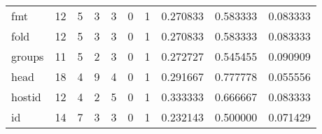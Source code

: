 \begin{longtable}{lrrrrrrrrr}
fmt       &                                      12 &                                                  5 &                                                  3 &                                                  3 &                                                  0 &                                                  1 &                                           0.270833 &                               0.583333 &                             0.083333 \\
fold      &                                      12 &                                                  5 &                                                  3 &                                                  3 &                                                  0 &                                                  1 &                                           0.270833 &                               0.583333 &                             0.083333 \\
groups    &                                      11 &                                                  5 &                                                  2 &                                                  3 &                                                  0 &                                                  1 &                                           0.272727 &                               0.545455 &                             0.090909 \\
head      &                                      18 &                                                  4 &                                                  9 &                                                  4 &                                                  0 &                                                  1 &                                           0.291667 &                               0.777778 &                             0.055556 \\
hostid    &                                      12 &                                                  4 &                                                  2 &                                                  5 &                                                  0 &                                                  1 &                                           0.333333 &                               0.666667 &                             0.083333 \\
id        &                                      14 &                                                  7 &                                                  3 &                                                  3 &                                                  0 &                                                  1 &                                           0.232143 &                               0.500000 &                             0.071429 \\

\end{longtable}
